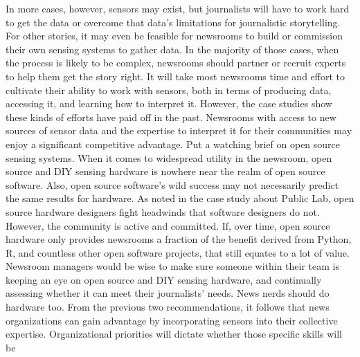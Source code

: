In more cases, however, sensors may exist, but journalists will have to work
hard to get the data or overcome that data's limitations for journalistic storytelling.
For other stories, it may even be feasible for newsrooms to build
or commission their own sensing systems to gather data. In the majority of
those cases, when the process is likely to be complex, newsrooms should
partner or recruit experts to help them get the story right.
It will take most newsrooms time and effort to cultivate their ability to work
with sensors, both in terms of producing data, accessing it, and learning
how to interpret it. However, the case studies show these kinds of efforts
have paid off in the past. Newsrooms with access to new sources of sensor
data and the expertise to interpret it for their communities may enjoy a significant
competitive advantage.
Put a watching brief on open source sensing systems.
When it comes to widespread utility in the newsroom, open source and
DIY sensing hardware is nowhere near the realm of open source software.
Also, open source software's wild success may not necessarily predict the
same results for hardware. As noted in the case study about Public Lab,
open source hardware designers fight headwinds that software designers
do not. However, the community is active and committed. If, over time,
open source hardware only provides newsrooms a fraction of the benefit
derived from Python, R, and countless other open software projects, that
still equates to a lot of value. Newsroom managers would be wise to make
sure someone within their team is keeping an eye on open source and DIY
sensing hardware, and continually assessing whether it can meet their
journalists' needs.
News nerds should do hardware too.
From the previous two recommendations, it follows that news organizations
can gain advantage by incorporating sensors into their collective expertise.
Organizational priorities will dictate whether those specific skills will be

